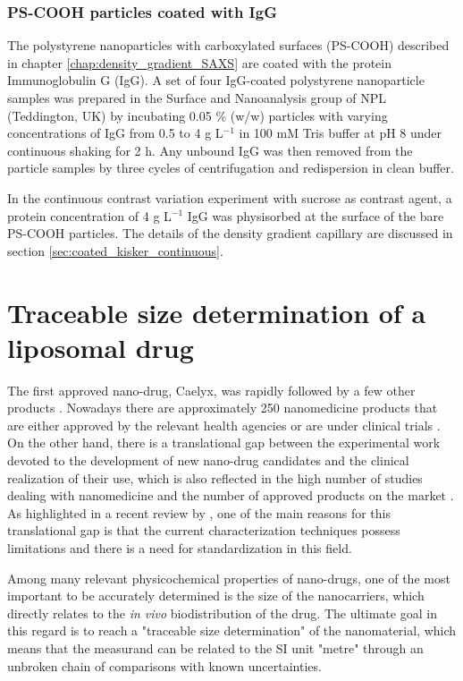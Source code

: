 \subsubsection{PS-COOH particles coated with IgG}

The polystyrene nanoparticles with carboxylated surfaces (PS-COOH) described in chapter \ref{chap:density_gradient_SAXS} are coated with the protein Immunoglobulin G (IgG). A set of four IgG-coated polystyrene nanoparticle samples was prepared in the Surface and Nanoanalysis group of NPL (Teddington, UK) by incubating 0.05 $\%$ (w/w) particles with varying concentrations of IgG from 0.5 to 4 g L$^{-1}$ in 100 mM Tris buffer at pH 8 under continuous shaking for 2 h. Any unbound IgG was then removed from the particle samples by three cycles of centrifugation and redispersion in clean buffer.

In the continuous contrast variation experiment with sucrose as contrast agent, a protein concentration of 4 g L$^{-1}$ IgG was physisorbed at the surface of the bare PS-COOH particles. The details of the density gradient capillary are discussed in section \ref{sec:coated_kisker_continuous}.


\section{Traceable size determination of a liposomal drug}
\label{sec:caelyx_size}

The first approved nano-drug, Caelyx, was rapidly followed by a few other products \citep{yeh_clinical_2011,barenholz_doxil-first_2012}. Nowadays there are approximately 250 nanomedicine products that are either approved by the relevant health agencies or are under clinical trials \citep{etheridge_big_2013}. On the other hand, there is a translational gap between the experimental work devoted to the development of new nano-drug candidates and the clinical realization of their use, which is also reflected in the high number of studies dealing with nanomedicine and the number of approved products on the market \citep{khorasani_closing_2014, venditto_cancer_2013}. As highlighted in a recent review by \cite{khorasani_closing_2014}, one of the main reasons for this translational gap is that the current characterization techniques possess limitations and there is a need for standardization in this field.

Among many relevant physicochemical properties of nano-drugs, one of the most important to be accurately determined is the size of the nanocarriers, which directly relates to the \emph{in vivo} biodistribution of the drug. The ultimate goal in this regard is to reach a "traceable size determination" of the nanomaterial, which means that the measurand can be related to the SI unit "metre" through an unbroken chain of comparisons with known uncertainties. 

